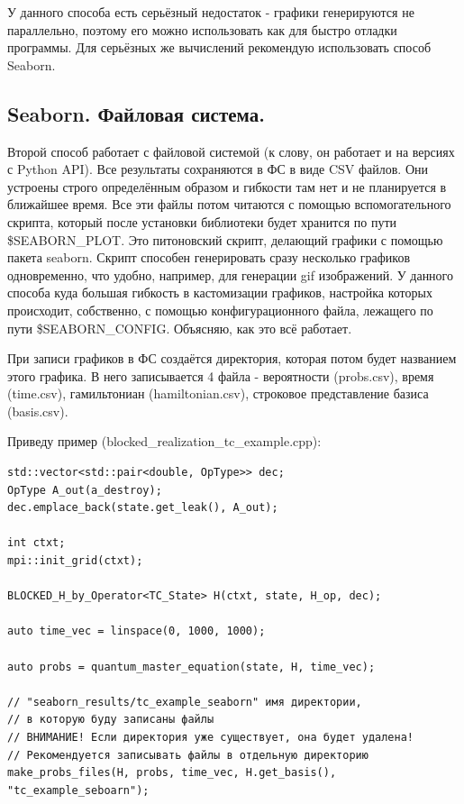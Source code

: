 \documentclass[12pt,fleqn]{article}
\begin{document}
        У данного способа есть серьёзный недостаток - графики генерируются не параллельно, поэтому его можно использовать как для быстро отладки программы. Для серьёзных же вычислений рекомендую 
        использовать способ Seaborn.

        \subsection{Seaborn. Файловая система.}

        Второй способ работает с файловой системой (к слову, он работает и на версиях с Python API). Все результаты сохраняются в ФС в виде CSV файлов. Они устроены строго определённым образом и 
        гибкости там нет и не планируется в ближайшее время. Все эти файлы потом читаются с помощью вспомогательного скрипта, который после установки библиотеки
        будет хранится по пути \textsf{\$SEABORN\_PLOT}.
        Это питоновский скрипт, делающий графики с помощью пакета \textsf{seaborn}.
        Скрипт способен генерировать сразу несколько графиков одновременно, что удобно, например, для генерации gif изображений.
        У данного способа куда большая гибкость в кастомизации графиков, настройка которых происходит, собственно,
        с помощью конфигурационного файла, лежащего по пути \textsf{\$SEABORN\_CONFIG}. Объясняю, 
        как это всё работает.

        При записи графиков в ФС создаётся директория, которая потом будет названием этого графика. В него записывается 4 файла - вероятности (\textsf{probs.csv}),
         время (\textsf{time.csv}), гамильтониан (\textsf{hamiltonian.csv}), строковое представление базиса (\textsf{basis.csv}).

        Приведу пример (\textsf{blocked\_realization\_tc\_example.cpp}):

\begin{mdframed}[linecolor=black, topline=true, bottomline=true,
leftline=false, rightline=false]
\begin{verbatim}
std::vector<std::pair<double, OpType>> dec;
OpType A_out(a_destroy);
dec.emplace_back(state.get_leak(), A_out);

int ctxt;
mpi::init_grid(ctxt);

BLOCKED_H_by_Operator<TC_State> H(ctxt, state, H_op, dec);

auto time_vec = linspace(0, 1000, 1000);

auto probs = quantum_master_equation(state, H, time_vec);

// "seaborn_results/tc_example_seaborn" имя директории,
// в которую буду записаны файлы
// ВНИМАНИЕ! Если директория уже существует, она будет удалена!
// Рекомендуется записывать файлы в отдельную директорию
make_probs_files(H, probs, time_vec, H.get_basis(), "tc_example_seboarn");
\end{verbatim}
\end{mdframed}
\end{document}
